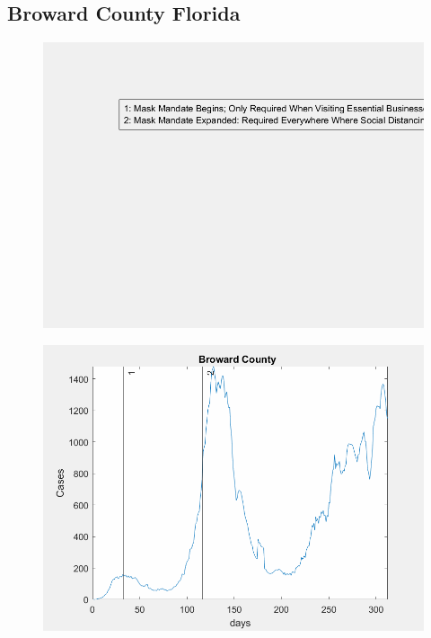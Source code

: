 \documentclass[12pt]{article}
\begin{document}
\FloatBarrier

\subsection[Subtitle]{\large Broward County Florida}

\begin{figure}[!h]
	\includegraphics[width=\linewidth]{legends/broward_mask_order_legend.png}
	\caption{}
	\label{fig:legends/broward_mask_order_legendLabel}
\end{figure}

\begin{figure}[!h]
	\includegraphics[width=\linewidth]{images/broward_mask_order.png}
	\caption{}
	\label{fig:images/broward_mask_orderLabel}
\end{figure}
\end{document}
